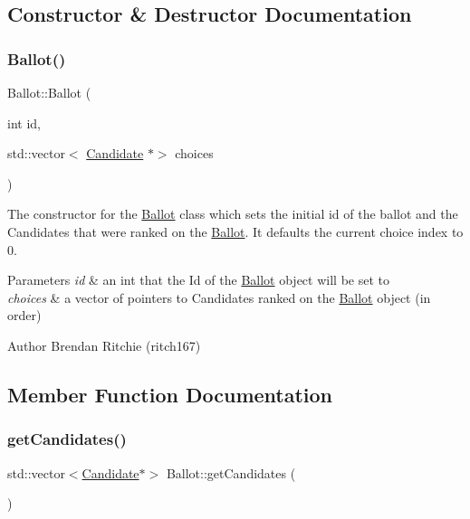 \subsection{Constructor \& Destructor Documentation}
\mbox{\label{classBallot_a2155c3611bf5c21502e04845386628cf}} 
\subsubsection{\texorpdfstring{Ballot()}{Ballot()}}
{\footnotesize\ttfamily Ballot\+::\+Ballot (\begin{DoxyParamCaption}\item[{int}]{id,  }\item[{std\+::vector$<$ \hyperlink{classCandidate}{Candidate} $\ast$$>$}]{choices }\end{DoxyParamCaption})}

The constructor for the \hyperlink{classBallot}{Ballot} class which sets the initial id of the ballot and the Candidates that were ranked on the \hyperlink{classBallot}{Ballot}. It defaults the current choice index to 0. 
\begin{DoxyParams}{Parameters}
{\em id} & an int that the Id of the \hyperlink{classBallot}{Ballot} object will be set to \\
\hline
{\em choices} & a vector of pointers to Candidates ranked on the \hyperlink{classBallot}{Ballot} object (in order) \\
\hline
\end{DoxyParams}
\begin{DoxyAuthor}{Author}
Brendan Ritchie (ritch167) 
\end{DoxyAuthor}


\subsection{Member Function Documentation}
\mbox{\label{classBallot_a7e8730a109ded9c1deeafe75bd1ad55c}} 
\subsubsection{\texorpdfstring{get\+Candidates()}{getCandidates()}}
{\footnotesize\ttfamily std\+::vector$<$\hyperlink{classCandidate}{Candidate}$\ast$$>$ Ballot\+::get\+Candidates (\begin{DoxyParamCaption}{ }\end{DoxyParamCaption})}

